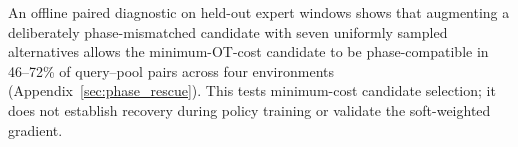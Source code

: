 An offline paired diagnostic on held-out expert windows shows that
augmenting a deliberately phase-mismatched candidate with seven uniformly
sampled alternatives allows the minimum-OT-cost candidate to be
phase-compatible in 46--72\% of query--pool pairs across four environments
(Appendix~\ref{sec:phase_rescue}). This tests minimum-cost candidate
selection; it does not establish recovery during policy training or
validate the soft-weighted gradient.
